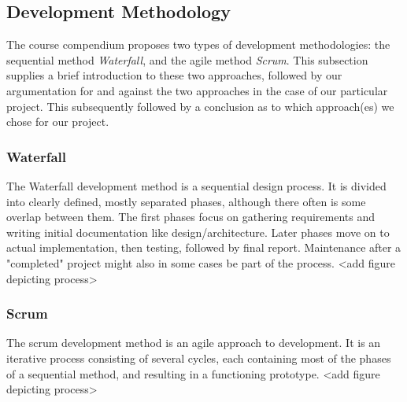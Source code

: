 \subsection{Development Methodology}
The course compendium proposes two types of development methodologies: the sequential method \emph{Waterfall}, and the agile method \emph{Scrum}. This subsection supplies a brief introduction to these two approaches, followed by our argumentation for and against the two approaches in the case of our particular project. This subsequently followed by a conclusion as to which approach(es) we chose for our project.
\subsubsection{Waterfall}
The Waterfall development method is a sequential design process. It is divided into clearly defined, mostly separated phases, although there often is some overlap between them. The first phases focus on gathering requirements and writing initial documentation like design/architecture. Later phases move on to actual implementation, then testing, followed by final report. Maintenance after a "completed" project might also in some cases be part of the process. <add figure depicting process>
\subsubsection{Scrum}
The scrum development method is an agile approach to development. It is an iterative process consisting of several cycles, each containing most of the phases of a sequential method, and resulting in a functioning prototype. <add figure depicting process>
